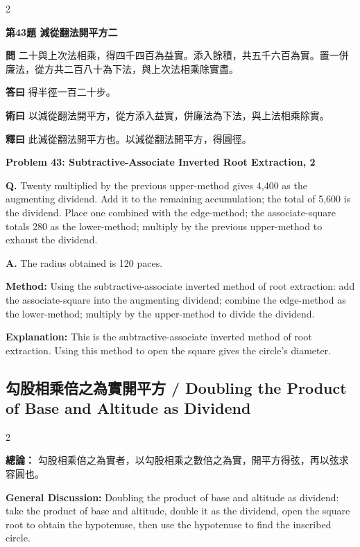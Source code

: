 \documentclass[11pt,a4paper]{article}
\newcommand{\wen}[1]{\noindent\textbf{問} #1\par\smallskip}
\newcommand{\da}[1]{\noindent\textbf{答曰} #1\par\smallskip}
\newcommand{\shu}[1]{\noindent\textbf{術曰} #1\par\smallskip}
\newcommand{\shi}[1]{\noindent\textbf{釋曰} #1\par\smallskip}
\newcommand{\wenE}[1]{\noindent\textbf{Q.} #1\par\smallskip}
\newcommand{\daE}[1]{\noindent\textbf{A.} #1\par\smallskip}
\newcommand{\shuE}[1]{\noindent\textbf{Method:} #1\par\smallskip}
\newcommand{\shiE}[1]{\noindent\textbf{Explanation:} #1\par\smallskip}
\begin{document}
\bigskip

\begin{paracol}{2}

\noindent\textbf{第43題 減從翻法開平方二}

\wen{二十與上次法相乘，得四千四百為益實。添入餘積，共五千六百為實。置一併廉法，從方共二百八十為下法，與上次法相乘除實盡。}
\da{得半徑一百二十步。}
\shu{以減從翻法開平方，從方添入益實，併廉法為下法，與上法相乘除實。}
\shi{此減從翻法開平方也。以減從翻法開平方，得圓徑。}

\switchcolumn

\noindent\textbf{Problem 43: Subtractive-Associate Inverted Root Extraction, 2}

\wenE{Twenty multiplied by the previous upper-method gives 4,400 as the augmenting dividend. Add it to the remaining accumulation; the total of 5,600 is the dividend. Place one combined with the edge-method; the associate-square totals 280 as the lower-method; multiply by the previous upper-method to exhaust the dividend.}
\daE{The radius obtained is 120 paces.}
\shuE{Using the subtractive-associate inverted method of root extraction: add the associate-square into the augmenting dividend; combine the edge-method as the lower-method; multiply by the upper-method to divide the dividend.}
\shiE{This is the subtractive-associate inverted method of root extraction. Using this method to open the square gives the circle's diameter.}

\end{paracol}

\clearpage

\subsection*{勾股相乘倍之為實開平方 / Doubling the Product of Base and Altitude as Dividend}

\begin{paracol}{2}

\noindent\textbf{總論：} 勾股相乘倍之為實者，以勾股相乘之數倍之為實，開平方得弦，再以弦求容圓也。

\switchcolumn

\noindent\textbf{General Discussion:} Doubling the product of base and altitude as dividend: take the product of base and altitude, double it as the dividend, open the square root to obtain the hypotenuse, then use the hypotenuse to find the inscribed circle.

\end{paracol}
\end{document}
